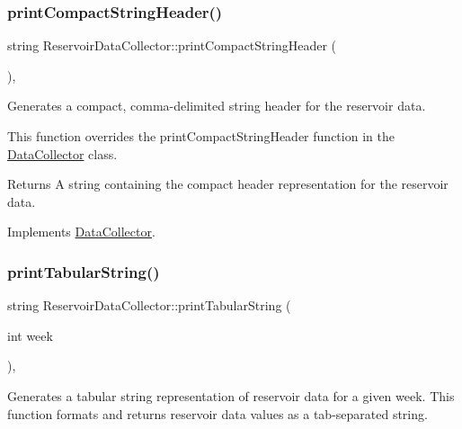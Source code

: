 \subsubsection{\texorpdfstring{print\+Compact\+String\+Header()}{printCompactStringHeader()}}
{\footnotesize\ttfamily string Reservoir\+Data\+Collector\+::print\+Compact\+String\+Header (\begin{DoxyParamCaption}{ }\end{DoxyParamCaption})\hspace{0.3cm}{\ttfamily [override]}, {\ttfamily [virtual]}}



Generates a compact, comma-\/delimited string header for the reservoir data. 

This function overrides the {\ttfamily print\+Compact\+String\+Header} function in the {\ttfamily \mbox{\hyperlink{classDataCollector}{Data\+Collector}}} class.

\begin{DoxyReturn}{Returns}
A string containing the compact header representation for the reservoir data. 
\end{DoxyReturn}


Implements \mbox{\hyperlink{classDataCollector_a98dcb4ec871d9c7fbf7545c64e5ccc67}{Data\+Collector}}.

\mbox{\label{classReservoirDataCollector_a81777b029bf26be403b9f4d67f01588b}} 
\subsubsection{\texorpdfstring{print\+Tabular\+String()}{printTabularString()}}
{\footnotesize\ttfamily string Reservoir\+Data\+Collector\+::print\+Tabular\+String (\begin{DoxyParamCaption}\item[{int}]{week }\end{DoxyParamCaption})\hspace{0.3cm}{\ttfamily [override]}, {\ttfamily [virtual]}}



Generates a tabular string representation of reservoir data for a given week. This function formats and returns reservoir data values as a tab-\/separated string. 


